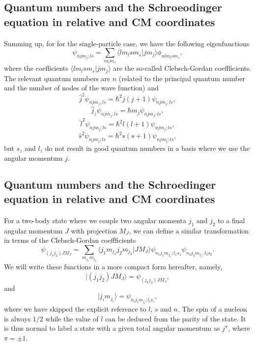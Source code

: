 \documentclass[%
twoside,                 %
final,                   %
10pt]{article}
\begin{document}
\subsection*{Quantum numbers and the Schroeodinger equation in relative and CM coordinates}

\paragraph{}
Summing up, for 
for the single-particle case, we have the following eigenfunctions 
\[
\psi_{njm_j;ls}=\sum_{m_lm_s}\langle lm_lsm_s|jm_j\rangle\phi_{nlm_lsm_s},
\]
where the coefficients $\langle lm_lsm_s|jm_j\rangle$ are the so-called Clebsch-Gordan coeffficients.
The relevant quantum numbers are $n$ (related to the principal quantum number and the number of nodes of the wave function) and 
\[
   \hat{j}^2\psi_{njm_j;ls}=\hbar^2j(j+1)\psi_{njm_j;ls},
\]
\[
   \hat{j}_z\psi_{njm_j;ls}=\hbar m_j\psi_{njm_j;ls},
\]
\[
   \hat{l}^2\psi_{njm_j;ls}=\hbar^2l(l+1)\psi_{njm_j;ls},
\]
\[
   \hat{s}^2\psi_{njm_j;ls}=\hbar^2s(s+1)\psi_{njm_j;ls},
\]
but $s_z$ and $l_z$ do not result in good quantum numbers in a basis where we
use the angular momentum $j$.



\subsection*{Quantum numbers and the Schroedinger equation in relative and CM coordinates}

\paragraph{}
For a two-body state where we couple two angular momenta $j_1$ and $j_2$ to a final
angular momentum $J$ with projection $M_J$, we can define a similar transformation in terms
of the Clebsch-Gordan coeffficients
\[
\psi_{(j_1j_2)JM_J}=\sum_{m_{j_1}m_{j_2}}\langle j_1m_{j_1}j_2m_{j_2}|JM_J\rangle\psi_{n_1j_1m_{j_1};l_1s_1}\psi_{n_2j_2m_{j_2};l_2s_2}.
\]
We will write these functions in a more compact form hereafter, namely,
\[
|(j_1j_2)JM_J\rangle=\psi_{(j_1j_2)JM_J},
\]
and
\[
|j_im_{j_i}\rangle=\psi_{n_ij_im_{j_i};l_is_i},
\]
where we have skipped the explicit reference to $l$, $s$ and $n$. The spin of a nucleon is always $1/2$ while the value of $l$ can be deduced from the parity of the state.
It is thus normal to label a state with a given total angular momentum as 
$j^{\pi}$, where $\pi=\pm 1$.
\end{document}

